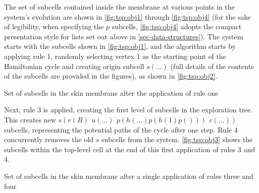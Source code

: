 The set of subcells contained inside the membrane at various points in the system's evolution are shown in \autoref{fig:tsp:obj1} through \autoref{fig:tsp:obj4} (for the sake of legibility, when specifying the \(p\) subcells, \autoref{fig:tsp:obj4} adopts the compact presentation style for lists set out above in \autoref{sec-data-structures}).  The system starts with the subcells shown in \autoref{fig:tsp:obj1}, and the algorithm starts by applying rule 1, randomly selecting vertex 1 as the starting point of the Hamiltonian cycle and creating origin subcell \(s(...)\) (full details of the contents of the subcells are provided in the figures), as shown in \autoref{fig:tsp:obj2}.

\begin{cpobjectsfloat}
\begin{cpobjects}
\end{cpobjects}
\caption{\label{fig:tsp:obj2}Set of subcells in the skin membrane after the application of rule one}
\end{cpobjectsfloat}

Next, rule 3 is applied, creating the first level of subcells in the exploration tree.  This creates new \(s(r(R) ~ \,u(...) ~ \,p(h(...)p(h(1)p())) ~ \,c(...))\) subcells, representing the potential paths of the cycle after one step.  Rule 4 concurrently removes the old \(s\) subcells from the system.  \autoref{fig:tsp:obj3} shows the subcells within the top-level cell at the end of this first application of rules 3 and 4.

\begin{cpobjectsfloat}
\begin{cpobjects}
\end{cpobjects}
\caption{\label{fig:tsp:obj3}Set of subcells in the skin membrane after a single application of rules three and four}
\end{cpobjectsfloat}

